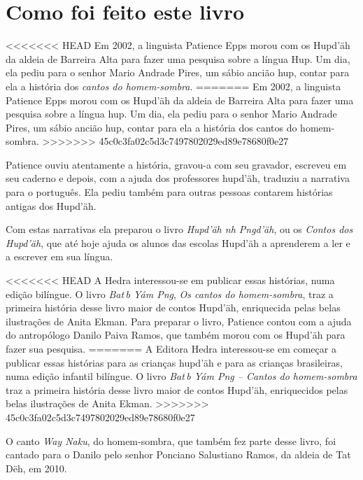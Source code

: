\chapter{Como foi feito este livro}

<<<<<<< HEAD
Em 2002, a linguista Patience Epps morou com os Hupd’äh da aldeia de Barreira Alta para fazer uma pesquisa sobre a língua Hup. Um dia, ela pediu para o senhor Mario Andrade Pires, um sábio ancião hup, contar para ela a história dos \textit{cantos do homem-sombra}.
=======
Em 2002, a linguista Patience Epps morou com os Hupd’äh da aldeia de Barreira Alta para fazer uma pesquisa sobre a língua hup. Um dia, ela pediu para o senhor Mario Andrade Pires, um sábio ancião hup, contar para ela a história dos cantos do homem-sombra.
>>>>>>> 45c0c3fa02c5d3c7497802029ed89e78680f0e27

Patience ouviu atentamente a história, gravou-a com seu gravador, escreveu em seu caderno e depois, com a ajuda dos professores hupd’äh, traduziu a narrativa para o português. Ela pediu também para outras pessoas contarem histórias antigas dos Hupd’äh.

Com estas narrativas ela preparou o livro \textit{Hupd’äh n\ii{}h P\ii{}n\II{}gd’äh}, ou os \textit{Contos dos Hupd’äh}, que até hoje ajuda os alunos das escolas Hupd’äh a aprenderem a ler e a escrever em sua língua.

<<<<<<< HEAD
A Hedra interessou-se em publicar essas histórias, numa edição bilíngue. O livro \textit{Bat\II{}\,b Yám P\ii n\II g}, \textit{Os cantos do homem-sombra}, traz a primeira história desse livro maior de contos Hupd’äh, enriquecida pelas belas ilustrações de Anita Ekman. Para preparar o livro, Patience contou com a ajuda do antropólogo Danilo Paiva Ramos, que também morou com os Hupd’äh para fazer sua pesquisa.
=======
A Editora Hedra interessou-se em começar a publicar essas histórias para as crianças hupd’äh e para as crianças brasileiras, numa edição infantil bilíngue. O livro \textit{Bat\II{}\,b Yám P\ii n\II g -- Cantos do homem-sombra} traz a primeira história desse livro maior de contos
Hupd’äh, enriquecidos pelas belas ilustrações de Anita Ekman.
>>>>>>> 45c0c3fa02c5d3c7497802029ed89e78680f0e27

O canto \textit{Way Naku}, do homem-sombra, que também fez parte desse livro, foi cantado
para o Danilo pelo senhor Ponciano Salustiano Ramos, da aldeia de Tat Dëh, em 2010.


